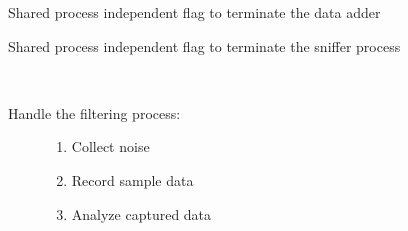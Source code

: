\documentclass[letterpaper,10pt,english]{sphinxmanual}
\begin{document}
\begin{fulllineitems}
\begin{fulllineitems}
\begin{quote}
\begin{description}
\end{description}\end{quote}

\end{fulllineitems}


\begin{fulllineitems}
\label{\detokenize{src:src.FilterTab.FilterTab.sharedDataAdderEnabledFlag}}
Shared process independent flag to terminate the data adder

\end{fulllineitems}


\begin{fulllineitems}
\label{\detokenize{src:src.FilterTab.FilterTab.sharedSnifferEnabledFlag}}
Shared process independent flag to terminate the sniffer process

\end{fulllineitems}


\begin{fulllineitems}
\label{\detokenize{src:src.FilterTab.FilterTab.startFilter}}~\begin{description}
\item[{Handle the filtering process:}] \leavevmode\begin{enumerate}
\item {} 
Collect noise

\item {} 
Record sample data

\item {} 
Analyze captured data

\end{enumerate}

\end{description}

\end{fulllineitems}



\end{fulllineitems}
\end{document}
